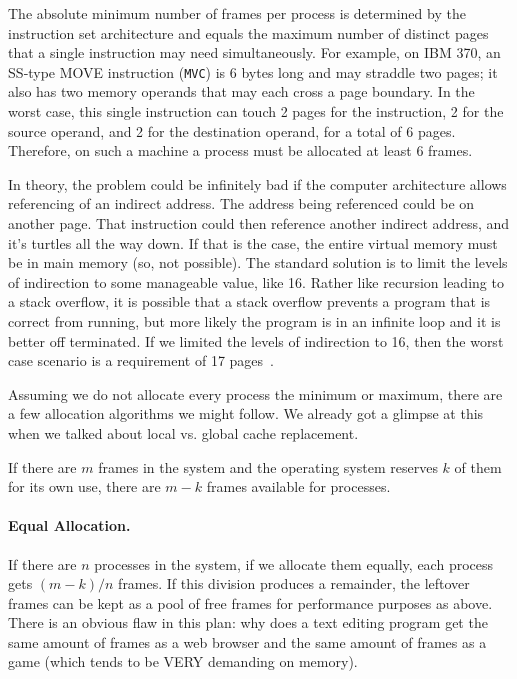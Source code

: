 The absolute minimum number of frames per process is determined by the instruction set architecture and equals the maximum number of distinct pages that a single instruction may need simultaneously. For example, on IBM 370, an SS‑type MOVE instruction (\texttt{MVC}) is 6 bytes long and may straddle two pages; it also has two memory operands that may each cross a page boundary. In the worst case, this single instruction can touch 2 pages for the instruction, 2 for the source operand, and 2 for the destination operand, for a total of 6 pages. Therefore, on such a machine a process must be allocated at least 6 frames.

In theory, the problem could be infinitely bad if the computer architecture allows referencing of an indirect address. The address being referenced could be on another page. That instruction could then reference another indirect address, and it's turtles all the way down. If that is the case, the entire virtual memory must be in main memory (so, not possible). The standard solution is to limit the levels of indirection to some manageable value, like 16. Rather like recursion leading to a stack overflow, it is possible that a stack overflow prevents a program that is correct from running, but more likely the program is in an infinite loop and it is better off terminated. If we limited the levels of indirection to 16, then the worst case scenario is a requirement of 17 pages~\cite{osc}.

Assuming we do not allocate every process the minimum or maximum, there are a few allocation algorithms we might follow. We already got a glimpse at this when we talked about local vs. global cache replacement.

If there are $m$ frames in the system and the operating system reserves $k$ of them for its own use, there are $m-k$ frames available for processes.

\paragraph{Equal Allocation.}  If there are $n$ processes in the system, if we allocate them equally, each process gets $(m-k)/n$ frames. If this division produces a remainder, the leftover frames can be kept as a pool of free frames for performance purposes as above. There is an obvious flaw in this plan: why does a text editing program get the same amount of frames as a web browser and the same amount of frames as a game (which tends to be VERY demanding on memory).

